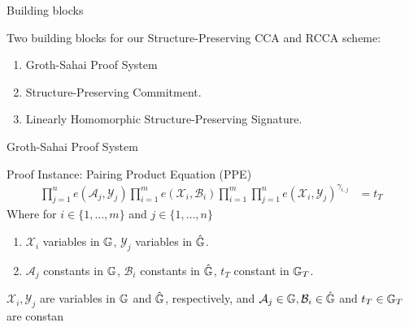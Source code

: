 
\begin{frame}{Building blocks}
  \begin{block}{Two building blocks for our Structure-Preserving CCA and RCCA scheme:}
    \begin{enumerate}
    \item Groth-Sahai Proof System 
    \item Structure-Preserving Commitment.
    \item Linearly Homomorphic Structure-Preserving Signature.
    \end{enumerate}
  \end{block}
\end{frame}


\begin{frame}{Groth-Sahai Proof System}
  \begin{block}{Proof Instance: Pairing Product Equation (PPE)}
    \begin{align*}
      \prod^{n}_{j=1} e(\mathcal{A}_j, \mathcal{Y}_j) \prod^{m}_{i=1}e(\mathcal{X}_i, \mathcal{B}_i)\prod^{m}_{i=1} \prod^{n}_{j=1}e(\mathcal{X}_i, \mathcal{Y}_j)^{\gamma_{i,j}} &= t_T
    \end{align*}
    Where for $i \in \{1, \dots, m\}$ and $j \in \{1, \dots, n\}$
    \begin{enumerate}
    \item $\mathcal{X}_i$ variables in $\mathbb{G}$, $\mathcal{Y}_j$ variables in $\hat{\mathbb{G}}$.
    \item $\mathcal{A}_j$ constants in $\mathbb{G}$, $\mathcal{B}_i$ constants in $\hat{\mathbb{G}}$, $t_T$ constant in $\mathbb{G}_T$.
    \end{enumerate}
    $\mathcal{X}_i, \mathcal{Y}_j$ are variables in $\mathbb{G}$ and $\hat{\mathbb{G}}$, respectively, and $\mathcal{A}_j \in \mathbb{G}, \mathcal{B}_i \in \hat{\mathbb{G}}$ and $t_T \in \mathbb{G}_T$ are constan
  \end{block}
  
\end{frame}

